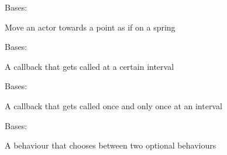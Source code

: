 \documentclass[letterpaper,10pt,english]{sphinxmanual}
\begin{document}

\begin{fulllineitems}
\label{blocks:serge.blocks.behaviours.SpringTowardsPoint}
Bases: {\hyperref[blocks:serge.blocks.behaviours.Behaviour]{}}

Move an actor towards a point as if on a spring

\end{fulllineitems}


\begin{fulllineitems}
\label{blocks:serge.blocks.behaviours.TimedCallback}
Bases: {\hyperref[blocks:serge.blocks.behaviours.Behaviour]{}}

A callback that gets called at a certain interval

\end{fulllineitems}


\begin{fulllineitems}
\label{blocks:serge.blocks.behaviours.TimedOneshotCallback}
Bases: {\hyperref[blocks:serge.blocks.behaviours.TimedCallback]{}}

A callback that gets called once and only once at an interval

\end{fulllineitems}


\begin{fulllineitems}
\label{blocks:serge.blocks.behaviours.TwoOptions}
Bases: {\hyperref[blocks:serge.blocks.behaviours.Behaviour]{}}

A behaviour that chooses between two optional behaviours

\end{fulllineitems}
\end{document}
